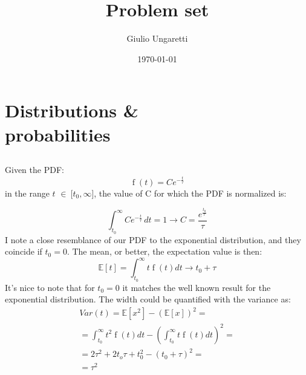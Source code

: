 \documentclass[twocolumn]{article}
\begin{document}
	\title{Problem set }
	\author{Giulio Ungaretti}
	\date{\today}

\clearpage
\section{Distributions \& \\ probabilities} %
	\label{sec:Distributions and probabilities}
	\subsection{} %
	\label{sub:}
	Given the PDF:
	\begin{equation}
		\operatorname{f}{\left (t \right )} = C e^{- \frac{t}{\tau}}
	\end{equation}
	in the range $t$ $\in~$[$ t_0, \infty $], the value of C for which the PDF is normalized is:

	\begin{equation}
		\int_{t_{{0}}}^{\infty} C e^{- \frac{t}{\tau}}\, dt = 1 \longrightarrow C =  \frac{
		e^{
		\frac{t_0}{\tau}
		}}
		{\tau}
	\end{equation}
	I note a close resemblance of our PDF to the exponential distribution, and they coincide if $t_0 = 0$. 
	The mean, or better, the expectation  value is then:
	\begin{equation}
	\mathbb{E} [t] = \int_{t_0}^{\infty} t \operatorname{f}{(t) d t } \longrightarrow  t_0 + \tau
	\end{equation}
	It's nice to note that for $t_0 = 0$ it matches the well known result for the exponential distribution.
	The width could be quantified with the variance as:
	\begin{multline}
		Var(t) = \mathbb{E}[x^2] - (\mathbb{E}[x])^2 = \\
		= 
		\int_{t_0}^{\infty} t^2 \operatorname{f}{(t) d t } 
		-(\int_{t_0}^{\infty} t \operatorname{f}{(t) d t })^2 = \\
		= 2 \tau ^ 2 + 2 t_o \tau +t_0 ^2  - ( t_0 + \tau ) ^ 2 = \\
		= \tau ^ 2
	\end{multline}
\end{document}
